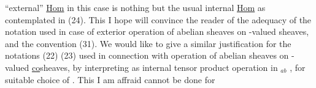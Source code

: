 ``external'' \uline{Hom} in this case is nothing but the  usual internal \uline{Hom}
as contemplated in (24). This I hope will convince the reader of the
adequacy of the notation used \hand{(}in case of exterior  operation of
abelian sheaves on -valued sheaves\hand{)}, and  the convention (31). We would
like to give a similar justification for the notations (22) (23) used in
connection with operation of abelian sheaves on -valued \uline{co}sheaves,
by interpreting  as  internal  tensor product operation in
$_{ab}$ , for suitable choice of . This I am affraid cannot be done for

